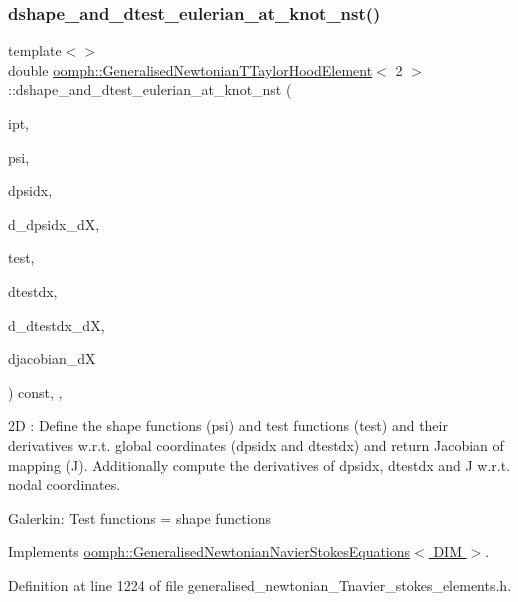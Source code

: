 \subsubsection{\texorpdfstring{dshape\+\_\+and\+\_\+dtest\+\_\+eulerian\+\_\+at\+\_\+knot\+\_\+nst()}{dshape\_and\_dtest\_eulerian\_at\_knot\_nst()}\hspace{0.1cm}{\footnotesize\ttfamily [3/4]}}
{\footnotesize\ttfamily template$<$$>$ \\
double \hyperlink{classoomph_1_1GeneralisedNewtonianTTaylorHoodElement}{oomph\+::\+Generalised\+Newtonian\+T\+Taylor\+Hood\+Element}$<$ 2 $>$\+::dshape\+\_\+and\+\_\+dtest\+\_\+eulerian\+\_\+at\+\_\+knot\+\_\+nst (\begin{DoxyParamCaption}\item[{const unsigned \&}]{ipt,  }\item[{\hyperlink{classoomph_1_1Shape}{Shape} \&}]{psi,  }\item[{\hyperlink{classoomph_1_1DShape}{D\+Shape} \&}]{dpsidx,  }\item[{\hyperlink{classoomph_1_1RankFourTensor}{Rank\+Four\+Tensor}$<$ double $>$ \&}]{d\+\_\+dpsidx\+\_\+dX,  }\item[{\hyperlink{classoomph_1_1Shape}{Shape} \&}]{test,  }\item[{\hyperlink{classoomph_1_1DShape}{D\+Shape} \&}]{dtestdx,  }\item[{\hyperlink{classoomph_1_1RankFourTensor}{Rank\+Four\+Tensor}$<$ double $>$ \&}]{d\+\_\+dtestdx\+\_\+dX,  }\item[{\hyperlink{classoomph_1_1DenseMatrix}{Dense\+Matrix}$<$ double $>$ \&}]{djacobian\+\_\+dX }\end{DoxyParamCaption}) const\hspace{0.3cm}{\ttfamily [inline]}, {\ttfamily [protected]}, {\ttfamily [virtual]}}

2D \+: Define the shape functions (psi) and test functions (test) and their derivatives w.\+r.\+t. global coordinates (dpsidx and dtestdx) and return Jacobian of mapping (J). Additionally compute the derivatives of dpsidx, dtestdx and J w.\+r.\+t. nodal coordinates.

Galerkin\+: Test functions = shape functions 

Implements \hyperlink{classoomph_1_1GeneralisedNewtonianNavierStokesEquations_a24a93b73dba66e04eabb9b37a9360daa}{oomph\+::\+Generalised\+Newtonian\+Navier\+Stokes\+Equations$<$ D\+I\+M $>$}.



Definition at line 1224 of file generalised\+\_\+newtonian\+\_\+\+Tnavier\+\_\+stokes\+\_\+elements.\+h.



